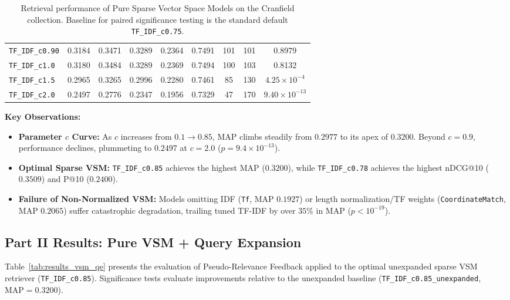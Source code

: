 \documentclass[10pt, a4paper]{article}
\begin{document}
\begin{table}[H]
\begin{tabular}{@{}lcccccccc@{}}
\texttt{TF\_IDF\_c0.90} & 0.3184 & 0.3471 & 0.3289 & 0.2364 & 0.7491 & 101 & 101 & 0.8979 \\
\texttt{TF\_IDF\_c1.0} & 0.3180 & 0.3484 & 0.3289 & 0.2369 & 0.7494 & 100 & 103 & 0.8132 \\
\texttt{TF\_IDF\_c1.5} & 0.2965 & 0.3265 & 0.2996 & 0.2280 & 0.7461 & 85 & 130 & $4.25 \times 10^{-4}$ \\
\texttt{TF\_IDF\_c2.0} & 0.2497 & 0.2776 & 0.2347 & 0.1956 & 0.7329 & 47 & 170 & $9.40 \times 10^{-13}$ \\ \bottomrule
\end{tabular}
\caption{Retrieval performance of Pure Sparse Vector Space Models on the Cranfield collection. Baseline for paired significance testing is the standard default \texttt{TF\_IDF\_c0.75}.}
\label{tab:results_vsm}
\end{table}

\noindent \textbf{Key Observations:}
\begin{itemize}[noitemsep,topsep=2pt]
    \item \textbf{Parameter $c$ Curve:} As $c$ increases from $0.1 \to 0.85$, MAP climbs steadily from $0.2977$ to its apex of $\mathbf{0.3200}$. Beyond $c=0.9$, performance declines, plummeting to $0.2497$ at $c=2.0$ ($p = 9.4 \times 10^{-13}$).
    \item \textbf{Optimal Sparse VSM:} \texttt{TF\_IDF\_c0.85} achieves the highest MAP ($0.3200$), while \texttt{TF\_IDF\_c0.78} achieves the highest nDCG@10 ($0.3509$) and P@10 ($0.2400$).
    \item \textbf{Failure of Non-Normalized VSM:} Models omitting IDF (\texttt{Tf}, MAP $0.1927$) or length normalization/TF weights (\texttt{CoordinateMatch}, MAP $0.2065$) suffer catastrophic degradation, trailing tuned TF-IDF by over $35\%$ in MAP ($p < 10^{-19}$).
\end{itemize}

\subsection{Part II Results: Pure VSM + Query Expansion}
\label{sec:results_part2}

Table~\ref{tab:results_vsm_qe} presents the evaluation of Pseudo-Relevance Feedback applied to the optimal unexpanded sparse VSM retriever (\texttt{TF\_IDF\_c0.85}). Significance tests evaluate improvements relative to the unexpanded baseline (\texttt{TF\_IDF\_c0.85\_unexpanded}, $\text{MAP} = 0.3200$).
\end{document}
